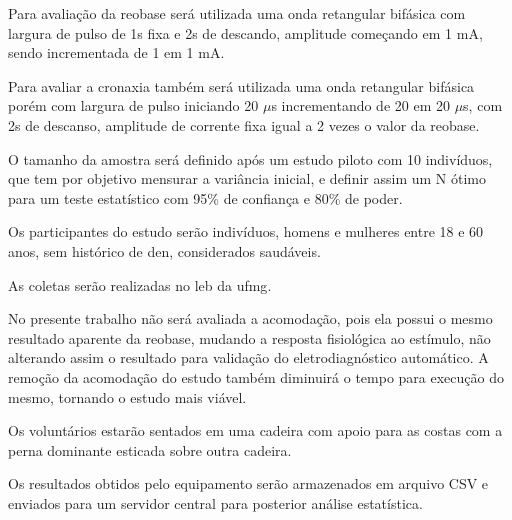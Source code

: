Para avaliação da reobase será utilizada uma onda retangular bifásica com largura de pulso de 1s fixa e 2s de descando, amplitude começando em 1 mA, sendo incrementada de 1 em 1 mA.

Para avaliar a cronaxia também será utilizada uma onda retangular bifásica porém com largura de pulso iniciando 20 $\mu$s incrementando de 20 em 20 $\mu$s, com 2s de descanso, amplitude de corrente fixa igual a 2 vezes o valor da reobase.

O tamanho da amostra será definido após um estudo piloto com 10 indivíduos, que tem por objetivo mensurar a variância inicial, e definir assim um N ótimo para um teste estatístico com 95\% de confiança e 80\% de poder.

Os participantes do estudo serão indivíduos, homens e mulheres entre 18 e 60 anos, sem histórico de \ac{den}, considerados saudáveis.

As coletas serão realizadas no \ac{leb} da \ac{ufmg}.

No presente trabalho não será avaliada a acomodação, pois ela possui o mesmo resultado aparente da reobase, mudando a resposta fisiológica ao estímulo, não alterando assim o resultado para validação do eletrodiagnóstico automático. A remoção da acomodação do estudo também diminuirá o tempo para execução do mesmo, tornando o estudo mais viável.

Os voluntários estarão sentados em uma cadeira com apoio para as costas com a perna dominante esticada sobre outra cadeira.

Os resultados obtidos pelo equipamento serão armazenados em arquivo CSV e enviados para um servidor central para posterior análise estatística.

